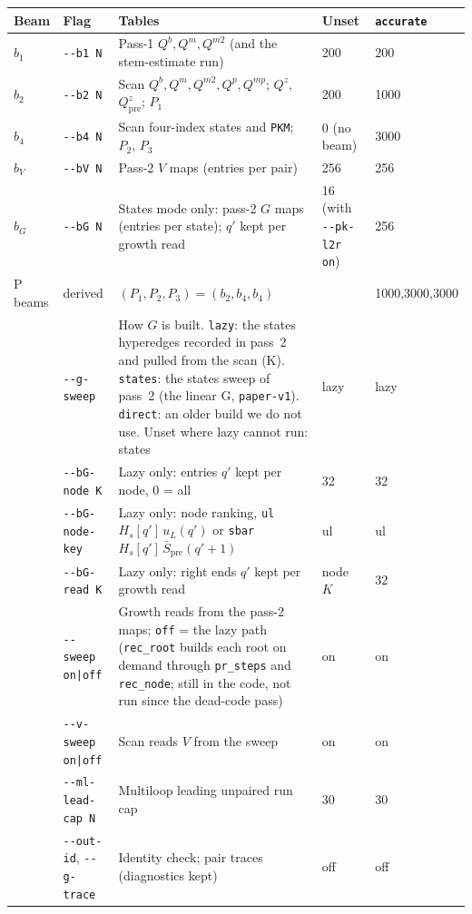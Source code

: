 \documentclass[11pt]{article}
\begin{document}
\begin{center}
\footnotesize
\begin{tabular}{@{}lp{}p{}p{}l@{}}
\toprule
Beam & Flag & Tables & Unset & \texttt{accurate} \\
\midrule
$b_1$ & \texttt{-{}-b1 N} & Pass-1 $Q^b,Q^m,Q^{m2}$ (and the stem-estimate run) & 200 & 200 \\
$b_2$ & \texttt{-{}-b2 N} & Scan $Q^b,Q^m,Q^{m2},Q^p,Q^{mp}$; $Q^z$, $Q^z_{\mathrm{pre}}$; $P_1$ & 200 & 1000 \\
$b_4$ & \texttt{-{}-b4 N} & Scan four-index states and \texttt{PKM}; $P_2$, $P_3$ & 0 (no beam) & 3000 \\
$b_V$ & \texttt{-{}-bV N} & Pass-2 $V$ maps (entries per pair) & 256 & 256 \\
$b_G$ & \texttt{-{}-bG N} & States mode only: pass-2 $G$ maps (entries per state); $q'$ kept per growth read & 16 (with \texttt{-{}-pk-l2r on}) & 256 \\
P beams & derived & $(P_1,P_2,P_3)=(b_2,b_4,b_4)$ & & 1000,3000,3000 \\
\midrule
 & \texttt{-{}-g-sweep} & How $G$ is built. \texttt{lazy}: the states hyperedges recorded in pass~2 and pulled from the scan (K). \texttt{states}: the states sweep of pass~2 (the linear G, \texttt{paper-v1}). \texttt{direct}: an older build we do not use. Unset where lazy cannot run: states & lazy & lazy \\
 & \texttt{-{}-bG-node K} & Lazy only: entries $q'$ kept per node, 0 = all & 32 & 32 \\
 & \texttt{-{}-bG-node-key} & Lazy only: node ranking, \texttt{ul} $H_s[q']\,u_L(q')$ or \texttt{sbar} $H_s[q']\,\bar S_{\mathrm{pre}}(q'+1)$ & ul & ul \\
 & \texttt{-{}-bG-read K} & Lazy only: right ends $q'$ kept per growth read & node $K$ & 32 \\
 & \texttt{-{}-sweep on|off} & Growth reads from the pass-2 maps; \texttt{off} = the lazy path (\texttt{rec\_root} builds each root on demand through \texttt{pr\_steps} and \texttt{rec\_node}; still in the code, not run since the dead-code pass) & on & on \\
 & \texttt{-{}-v-sweep on|off} & Scan reads $V$ from the sweep & on & on \\
 & \texttt{-{}-ml-lead-cap N} & Multiloop leading unpaired run cap & 30 & 30 \\
 & \texttt{-{}-out-id}, \texttt{-{}-g-trace} & Identity check; pair traces (diagnostics kept) & off & off \\
\bottomrule
\end{tabular}
\end{center}
\end{document}
